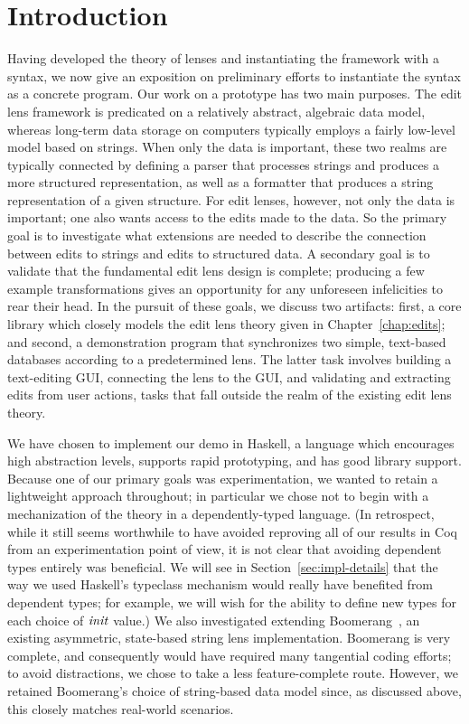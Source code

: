 \section{Introduction}
\label{sec:impl-intro}
Having developed the theory of lenses and instantiating the framework with a
syntax, we now give an exposition on preliminary efforts to instantiate the
syntax as a concrete program. Our work on a prototype has two main purposes.
The edit lens framework is predicated on a relatively abstract, algebraic
data model, whereas long-term data storage on computers typically employs a
fairly low-level model based on strings. When only the data is important,
these two realms are typically connected by defining a parser that processes
strings and produces a more structured representation, as well as a
formatter that produces a string representation of a given structure. For
edit lenses, however, not only the data is important; one also wants access
to the edits made to the data. So the primary goal is to investigate what
extensions are needed to describe the connection between edits to strings
and edits to structured data. A secondary goal is to validate that the
fundamental edit lens design is complete; producing a few example
transformations gives an opportunity for any unforeseen infelicities to rear
their head. In the pursuit of these goals, we discuss two artifacts: first,
a core library which closely models the edit lens theory given in
Chapter~\ref{chap:edits}; and second, a demonstration program that
synchronizes two simple, text-based databases according to a predetermined
lens. The latter task involves building a text-editing GUI, connecting the
lens to the GUI, and validating and extracting edits from user actions,
tasks that fall outside the realm of the existing edit lens theory.

We have chosen to implement our demo in Haskell, a language which encourages
high abstraction levels, supports rapid prototyping, and has good library
support. Because one of our primary goals was experimentation, we wanted to
retain a lightweight approach throughout; in particular we chose not to
begin with a mechanization of the theory in a dependently-typed language.
(In retrospect, while it still seems worthwhile to have avoided reproving
all of our results in Coq from an experimentation point of view, it is not
clear that avoiding dependent types entirely was beneficial. We will see in
Section~\ref{sec:impl-details} that the way we used Haskell's typeclass
mechanism would really have benefited from dependent types; for example, we
will wish for the ability to define new types for each choice of $\mathit{init}$
value.) We also investigated extending Boomerang~\cite{Boomerang07}, an
existing asymmetric, state-based string lens implementation. Boomerang is
very complete, and consequently would have required many tangential coding
efforts; to avoid distractions, we chose to take a less feature-complete
route. However, we retained Boomerang's choice of string-based data model
since, as discussed above, this closely matches real-world scenarios.

